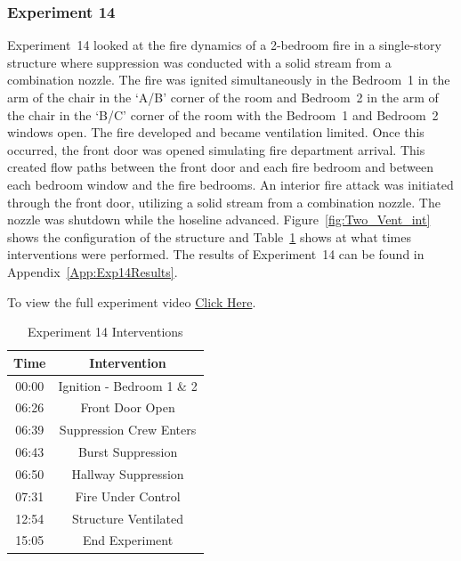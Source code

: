 \documentclass[12pt,oneside]{book}
\begin{document}
\subsubsection{Experiment 14}
Experiment~14 looked at the fire dynamics of a 2-bedroom fire in a single-story structure where suppression was conducted with a solid stream from a combination nozzle. The fire was ignited simultaneously in the Bedroom~1 in the arm of the chair in the `A/B' corner of the room and Bedroom~2 in the arm of the chair in the `B/C' corner of the room with the Bedroom~1 and Bedroom~2 windows open. The fire developed and became ventilation limited. Once this occurred, the front door was opened simulating fire department arrival. This created flow paths between the front door and each fire bedroom and between each bedroom window and the fire bedrooms. An interior fire attack was initiated through the front door, utilizing a solid stream from a combination nozzle. The nozzle was shutdown while the hoseline advanced. Figure~\ref{fig:Two_Vent_int} shows the configuration of the structure and Table~\ref{Table:Exp14Interventions} shows at what times interventions were performed. The results of Experiment~14 can be found in Appendix~\ref{App:Exp14Results}. 

To view the full experiment video \href{https://player.vimeo.com/video/170499611?autoplay=1}{Click Here}.

\begin{table}[H]
	\centering
	\caption{Experiment 14 Interventions}
	\begin{tabular}{|c|c|} 
		\hline
		Time & Intervention \\ \hline \hline
		00:00 & Ignition - Bedroom 1 \& 2 \\ \hline
		06:26 & Front Door Open \\ \hline
		06:39 & Suppression Crew Enters\\ \hline
		06:43 & Burst Suppression \\ \hline 
		06:50 & Hallway Suppression \\ \hline
		07:31 & Fire Under Control 	\\ \hline
		12:54 & Structure Ventilated \\ \hline
		15:05 & End Experiment\\ \hline
	\end{tabular}
	\label{Table:Exp14Interventions}
\end{table}

\FloatBarrier
\clearpage
\end{document}
